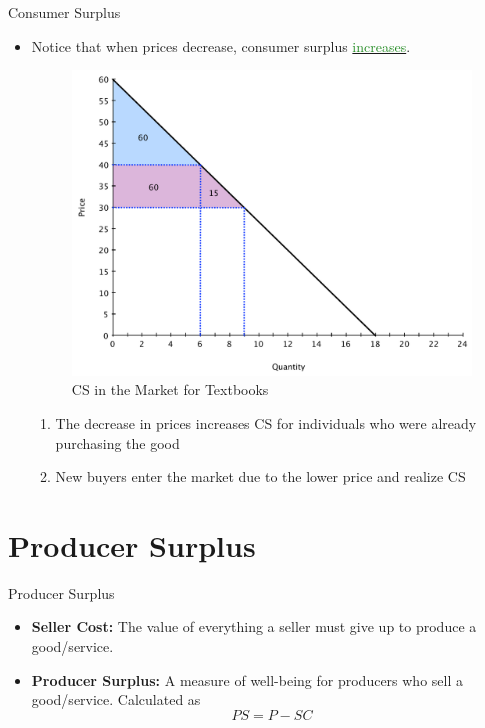 \documentclass[xcolor={dvipsnames},pdf, hyperref={colorlinks=true, citecolor=ForestGreen, linkcolor=BlueViolet, urlcolor=Magenta}]{beamer}
\newcommand{\defn}[1]{\textbf{#1}}
\newcommand{\dd}[1]{{\underline{\textcolor{ForestGreen}{#1}}}}
\begin{document}
\begin{frame}{Consumer Surplus}
		\begin{itemize}
		\item	Notice that when prices decrease, consumer surplus \dd{increases}.  
			\begin{figure}[H]
			\centering
			\includegraphics[scale=.25]{plot19.pdf}
			\caption{CS in the Market for Textbooks}
		\end{figure}	
			\begin{enumerate}
				\item The decrease in prices increases CS for individuals who were already purchasing the good 
				\item New buyers enter the market due to the lower price and realize CS 
			\end{enumerate}
		\end{itemize}
\end{frame}

\section{Producer Surplus}
	
		\begin{frame}{Producer Surplus}
			\begin{itemize}
			\item \defn{Seller Cost:} The value of everything a seller must give up to produce a good/service.
			\item \defn{Producer Surplus:} A measure of well-being for producers who sell a good/service. Calculated as 
			\[PS = P - SC\]
				\end{itemize}
		\end{frame}
	
\end{document}
